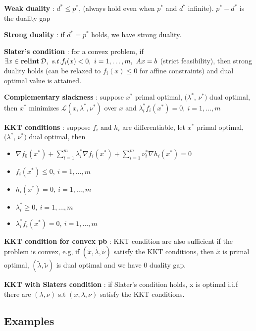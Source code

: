 \documentclass[a4paper, 10pt]{article}
\newcommand{\grad}[1]{\nabla{#1}}
\newcommand{\Lag}{\mathcal{L}}
\newcommand{\relint}[1]{\textbf{relint}\hspace{0.2em}#1}
\newcommand{\inter}[1]{\textbf{int}\hspace{0.2em}#1}
\newcommand{\itm}[1]{{\color{itmcolor} \textbf{#1}}}
\begin{document}
\itm{Weak duality} : $d^* \le p^*$, (always hold even when $p^*$ and
$d^*$ infinite). $p^* - d^*$ is the duality gap

\itm{Strong duality} : if $d^* = p^*$ holds, we have strong duality.

\itm{Slater's condition} : for a convex problem, if
$\exists x \in \relint{\mathcal{D}},\ s.t. f_i(x) < 0,\ i = 1, \dots,
m,\ A x = b$ (strict feasibility), then strong duality holds (can be
relaxed to $f_i(x) \le 0$ for affine constraints) and dual optimal value is attained.


\itm{Complementary slackness} : suppose $x^*$ primal optimal,
$(\lambda^*$, $\nu^*)$ dual optimal, then $x^*$ minimizes
$\Lag(x, \lambda^*, \nu^*)$ over $x$ and
$\lambda_i^* f_i(x^*) = 0,\ i = 1,\dots, m$

\itm{KKT conditions} : suppose $f_i$ and $h_i$ are differentiable, let
$x^*$ primal optimal, $(\lambda^*$, $\nu^*)$ dual optimal, then
\begin{itemize}
\item $\grad{f_0}(x^*) + \sum_{i = 1}^m \lambda_i^* \grad{f_i}(x^*) + \sum_{i = 1}^m \nu_i^* \grad{h_i}(x^*) = 0$
\item $f_i(x^*) \le 0,\ i = 1, \dots, m$
\item $h_i(x^*) = 0,\ i = 1, \dots, m$
\item $\lambda_i^* \ge 0,\ i = 1, \dots, m$
\item $\lambda_i^* f_i(x^*) = 0,\ i = 1, \dots, m$
\end{itemize}

\itm{KKT condition for convex pb} : KKT condition are also sufficient
if the problem is convex, e.g, if
$(\tilde{x}, \tilde{\lambda}, \tilde{\nu})$ satisfy the KKT
conditions, then $\tilde{x}$ is primal optimal,
$(\tilde{\lambda}, \tilde{\nu})$ is dual optimal and we have $0$
duality gap.

\itm{KKT with Slaters condition} : if Slater's condition holds, x is
optimal i.i.f there are $(\lambda, \nu)$ s.t $(x, \lambda, \nu)$
satisfy the KKT conditions.

\subsection{Examples}
\end{document}
